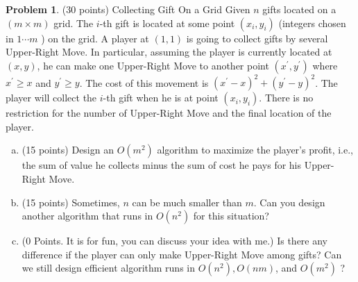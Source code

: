 \documentclass{article}
\theoremstyle{definition}
\newtheorem{prob}{Problem}
\begin{document}
	\begin{prob} 
		(30 points) Collecting Gift On a Grid Given $n$ gifts located on a $(m \times m)$ grid. The $i$-th gift is located at some point $\left(x_{i}, y_{i}\right)$ (integers chosen in $1 \cdots m$ ) on the grid. A player at $(1,1)$ is going to collect gifts by several Upper-Right Move. In particular, assuming the player is currently located at $(x, y)$, he can make one Upper-Right Move to another point $\left(x^{\prime}, y^{\prime}\right)$ where $x^{\prime} \geq x$ and $y^{\prime} \geq y$. The cost of this movement is $\left(x^{\prime}-x\right)^{2}+\left(y^{\prime}-y\right)^{2}$. The player will collect the $i$-th gift when he is at point $\left(x_{i}, y_{i}\right)$. There is no restriction for the number of Upper-Right Move and the final location of the player.
		\begin{enumerate}[(a)]
			\item (15 points) Design an $O\left(m^{2}\right)$ algorithm to maximize the player's profit, i.e., the sum of value he collects minus the sum of cost he pays for his Upper-Right Move.
			\item (15 points) Sometimes, $n$ can be much smaller than $m$. Can you design another algorithm that runs in $O\left(n^{2}\right)$ for this situation?
			\item (0 Points. It is for fun, you can discuss your idea with me.) Is there any difference if the player can only make Upper-Right Move among gifts? Can we still design efficient algorithm runs in $O\left(n^{2}\right), O(n m)$, and $O\left(m^{2}\right)$ ?
		\end{enumerate}
	\end{prob}
	
\end{document}
